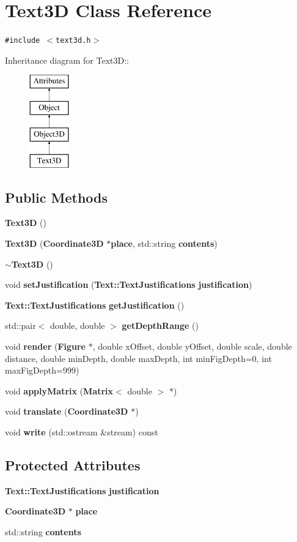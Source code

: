 \section{Text3D Class Reference}
\label{classText3D}
{\tt \#include $<$text3d.h$>$}

Inheritance diagram for Text3D::\begin{figure}[H]
\begin{center}
\leavevmode
\includegraphics[height=4cm]{classText3D}
\end{center}
\end{figure}
\subsection*{Public Methods}
\begin{CompactItemize}
\item 
{\bf Text3D} ()
\item 
{\bf Text3D} ({\bf Coordinate3D} $\ast${\bf place}, std::string {\bf contents})
\item 
{\bf $\sim$Text3D} ()
\item 
void {\bf set\-Justification} ({\bf Text::Text\-Justifications} {\bf justification})
\item 
{\bf Text::Text\-Justifications} {\bf get\-Justification} ()
\item 
std::pair$<$ double, double $>$ {\bf get\-Depth\-Range} ()
\item 
void {\bf render} ({\bf Figure} $\ast$, double x\-Offset, double y\-Offset, double scale, double distance, double min\-Depth, double max\-Depth, int min\-Fig\-Depth=0, int max\-Fig\-Depth=999)
\item 
void {\bf apply\-Matrix} ({\bf Matrix}$<$ double $>$ $\ast$)
\item 
void {\bf translate} ({\bf Coordinate3D} $\ast$)
\item 
void {\bf write} (std::ostream \&stream) const
\end{CompactItemize}
\subsection*{Protected Attributes}
\begin{CompactItemize}
\item 
{\bf Text::Text\-Justifications} {\bf justification}
\item 
{\bf Coordinate3D} $\ast$ {\bf place}
\item 
std::string {\bf contents}
\end{CompactItemize}


